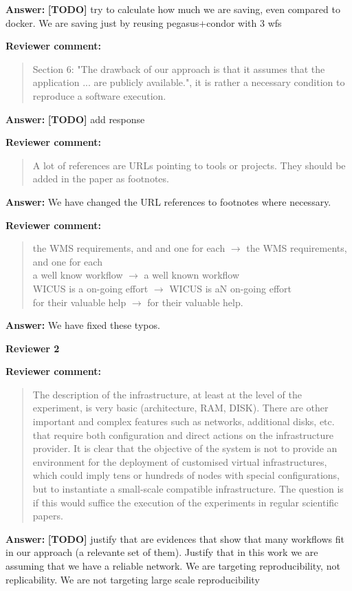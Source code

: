 \documentclass{letter}
\newenvironment{review}%
{\textbf{Reviewer comment:}\begin{quote}}%
{\end{quote}}%
\newcommand{\todo}[1]{%
      \color{red}\textbf{[TODO]} #1\color{black}}
\newcommand{\answer}[1]{%
      \textbf{Answer:} #1}
\begin{document}
\begin{letter}{}
\answer{\todo{try to calculate how much we are saving, even compared to docker. We are saving just by reusing pegasus+condor with 3 wfs}}


\begin{review}
Section 6: "The drawback of our approach is that it assumes that the application ...  are publicly available.", it is rather a necessary condition to reproduce a software execution.
\end{review}

\answer{\todo{add response}}


\begin{review}
A lot of references are URLs pointing to tools or projects. They should be added in the paper as footnotes.
\end{review}

\answer{We have changed the URL references to footnotes where necessary.}


\begin{review}
the WMS requirements, and and one for each $\rightarrow$ the WMS requirements, and one for each \\
a well know workflow $\rightarrow$ a well known workflow \\
WICUS is a on-going effort $\rightarrow$ WICUS is aN on-going effort \\
for their valuable help $\rightarrow$ for their valuable help.
\end{review}

\answer{We have fixed these typos.}



\newpage

%
%
\textbf{Reviewer 2}


\begin{review}
The description of the infrastructure, at least at the level of the experiment, is very basic (architecture, RAM, DISK). There are other important and complex features such as networks, additional disks, etc. that require both configuration and direct actions on the infrastructure provider. It is clear that the objective of the system is not to provide an environment for the deployment of customised virtual infrastructures, which could imply tens or hundreds of nodes with special configurations, but to instantiate a small-scale compatible infrastructure. The question is if this would suffice the execution of the experiments in regular scientific papers.
\end{review}

\answer{\todo{justify that are evidences that show that many workflows fit in our approach (a relevante set of them). Justify that in this work we are assuming that we have a reliable network. We are targeting reproducibility, not replicability. We are not targeting large scale reproducibility}}


\end{letter}
\end{document}
